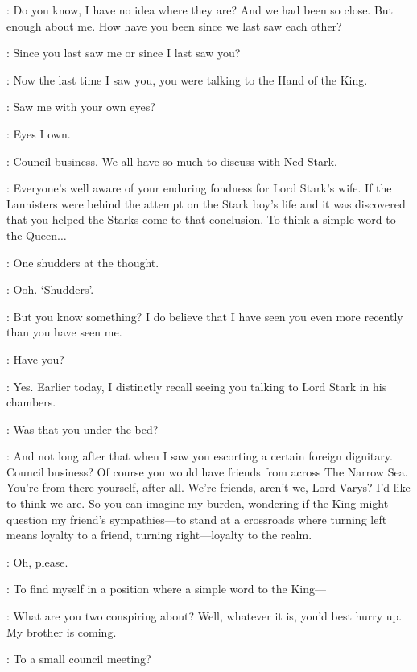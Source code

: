\VARYS: Do you know, I have no idea where they are? And we had been so close. But enough about me. How have you been since we last saw each other? 

\LITTLEFINGER: Since you last saw me or since I last saw you? 

\VARYS: Now the last time I saw you, you were talking to the Hand of the King. 

\LITTLEFINGER: Saw me with your own eyes? 

\VARYS: Eyes I own. 

\LITTLEFINGER: Council business. We all have so much to discuss with Ned Stark. 

\VARYS: Everyone's well aware of your enduring fondness for Lord Stark's wife. If the Lannisters were behind the attempt on the Stark boy's life and it was discovered that you helped the Starks come to that conclusion. To think a simple word to the Queen$\ldots$ 

\LITTLEFINGER: One shudders at the thought. 

\VARYS: Ooh. `Shudders'. 

\LITTLEFINGER: But you know something? I do believe that I have seen you even more recently than you have seen me. 

\VARYS: Have you? 

\LITTLEFINGER: Yes. Earlier today, I distinctly recall seeing you talking to Lord Stark in his chambers. 

\VARYS: Was that you under the bed? 

\LITTLEFINGER: And not long after that when I saw you escorting a certain foreign dignitary. Council business? Of course you would have friends from across The Narrow Sea. You're from there yourself, after all. We're friends, aren't we, Lord Varys? I'd like to think we are. So you can imagine my burden, wondering if the King might question my friend's sympathies---to stand at a crossroads where turning left means loyalty to a friend, turning right---loyalty to the realm. 

\VARYS: Oh, please. 

\LITTLEFINGER: To find myself in a position where a simple word to the King---


\RENLY: What are you two conspiring about? Well, whatever it is, you'd best hurry up. My brother is coming.  

\LITTLEFINGER: To a small council meeting? 

